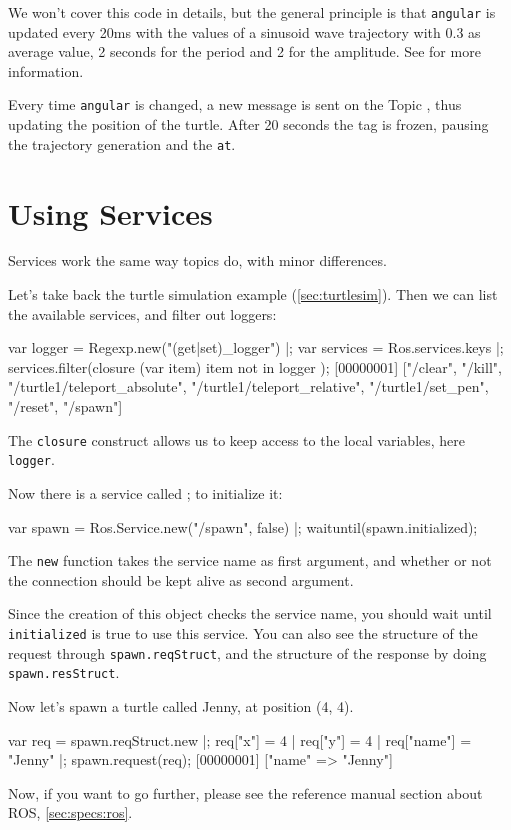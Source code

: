 We won't cover this code in details, but the general principle is that
\lstinline{angular} is updated every 20ms with the values of a sinusoid wave
trajectory with 0.3 as average value, 2 seconds for the period and 2 for the
amplitude.  See  for more information.

Every time \lstinline{angular} is changed, a new message is sent on the
Topic , thus updating the position of the
turtle.  After 20 seconds the tag is frozen, pausing the trajectory
generation and the \lstinline{at}.

\section{Using Services}

Services work the same way topics do, with minor differences.

Let's take back the turtle simulation example (\autoref{sec:turtlesim}).
Then we can list the available services, and filter out loggers:

\begin{urbiunchecked}
var logger = Regexp.new("(get|set)_logger") |;
var services = Ros.services.keys |;
services.filter(closure (var item) { item not in logger });
[00000001] ["/clear", "/kill", "/turtle1/teleport_absolute", "/turtle1/teleport_relative", "/turtle1/set_pen", "/reset", "/spawn"]
\end{urbiunchecked}

The \lstinline{closure} construct allows us to keep access to the local
variables, here \lstinline{logger}.

Now there is a service called ; to initialize it:

\begin{urbiunchecked}
var spawn = Ros.Service.new("/spawn", false) |;
waituntil(spawn.initialized);
\end{urbiunchecked}

The \lstinline{new} function takes the service name as first argument, and
whether or not the connection should be kept alive as second argument.

Since the creation of this object checks the service name, you should wait
until \lstinline{initialized} is true to use this service.  You can also see
the structure of the request through \lstinline{spawn.reqStruct}, and the
structure of the response by doing \lstinline{spawn.resStruct}.

Now let's spawn a turtle called Jenny, at position (4, 4).

\begin{urbiunchecked}
var req = spawn.reqStruct.new |;
req["x"] = 4 |
req["y"] = 4 |
req["name"] = "Jenny" |;
spawn.request(req);
[00000001] ["name" => "Jenny"]
\end{urbiunchecked}

\bigskip

Now, if you want to go further, please see the reference manual section
about ROS, \autoref{sec:specs:ros}.

